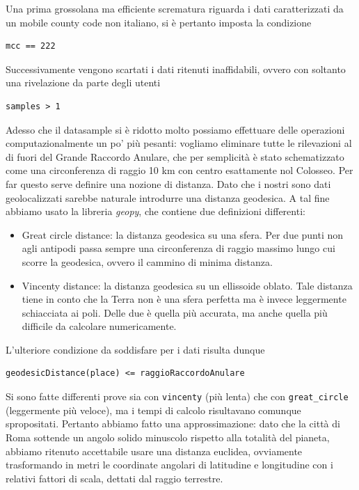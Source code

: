 Una prima grossolana ma efficiente scrematura riguarda i dati caratterizzati da un mobile county code non italiano, si è pertanto imposta la condizione
\begin{lstlisting}
mcc == 222
\end{lstlisting}
Successivamente vengono scartati i dati ritenuti inaffidabili, ovvero con soltanto una rivelazione da parte degli utenti
\begin{lstlisting}
samples > 1
\end{lstlisting}

Adesso che il datasample si è ridotto molto possiamo effettuare delle operazioni computazionalmente un po' più pesanti: vogliamo eliminare tutte le rilevazioni al di fuori del Grande Raccordo Anulare, che per semplicità è stato schematizzato come una circonferenza di raggio 10 km con centro esattamente nol Colosseo. Per far questo serve definire una nozione di distanza. Dato che i nostri sono dati geolocalizzati sarebbe naturale introdurre una distanza geodesica. A tal fine abbiamo usato la libreria \emph{geopy}, che contiene due definizioni differenti:

\begin{itemize}
 \item Great circle distance: la distanza geodesica su una sfera. Per due punti non agli antipodi passa sempre una circonferenza di raggio massimo lungo cui scorre la geodesica, ovvero il cammino di minima distanza. 
 \item Vincenty distance: la distanza geodesica su un ellissoide oblato. Tale distanza tiene in conto che la Terra non è una sfera perfetta ma è invece leggermente schiacciata ai poli. Delle due è quella più accurata, ma anche quella più difficile da calcolare numericamente.
\end{itemize}
L'ulteriore condizione da soddisfare per i dati risulta dunque
\begin{lstlisting}
geodesicDistance(place) <= raggioRaccordoAnulare
\end{lstlisting}

Si sono fatte differenti prove sia con \lstinline{vincenty} (più lenta) che con \lstinline{great_circle} (leggermente più veloce), ma i tempi di calcolo risultavano comunque spropositati. Pertanto abbiamo fatto una approssimazione: dato che la città di Roma sottende un angolo solido minuscolo rispetto alla totalità del pianeta, abbiamo ritenuto accettabile usare una distanza euclidea, ovviamente trasformando in metri le coordinate angolari di latitudine e longitudine con i relativi fattori di scala, dettati dal raggio terrestre.

